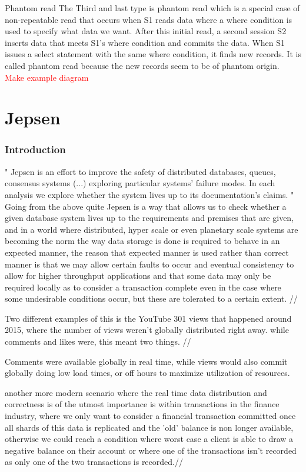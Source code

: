 \documentclass[a4paper,10pt,titlepage]{report}
\begin{document}
Phantom read
The Third and last type is phantom read which is a special case of non-repeatable read that occurs when S1 reads data where a where condition is used to specify what data we want. After this initial read, a second session S2 inserts data that meets S1's where condition and commits the data. When S1 issues a select statement with the same where condition, it finds new records. It is called phantom read because the new records seem to be of phantom origin.
 \textcolor{red}{Make example diagram}





\chapter{Jepsen}


\subsection{Introduction}
"
Jepsen is an effort to improve the safety of distributed databases, queues, consensus systems  (...) exploring particular systems’ failure modes. In each analysis we explore whether the system lives up to its documentation’s claims.
"\cite{jepsonio}
\\

Going from the above quite Jepsen is a way that allows us to check whether a given database system lives up to the requirements and premises that are given, and in a world where distributed, hyper scale or even planetary scale systems are becoming the norm the way data storage is done is required to behave in an expected manner, the reason that expected manner is used rather than correct manner is that we may allow certain faults to occur and eventual consistency to allow for higher throughput applications and that some data may only be required locally as to consider a transaction complete even in the case where some undesirable conditions occur, but these are tolerated to a certain extent. //

Two different examples of this is the YouTube 301 views that happened around 2015, where the number of views weren't globally distributed right away. while comments and likes were, this meant two things. //

Comments were available globally in real time, while views would also commit globally doing low load times, or off hours to maximize utilization of resources.

another more modern scenario where the real time data distribution and correctness is of the utmost importance is within transactions in the finance industry,  where we only want to consider a financial transaction committed once all shards of this data is replicated and the 'old' balance is non longer available, otherwise we could reach a condition where worst case a client is able to draw a negative balance on their account or where one of the transactions isn't recorded as only one of the two transactions is recorded.//
\end{document}
